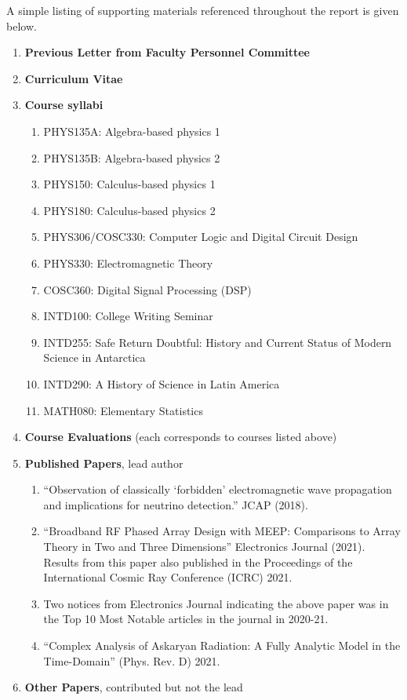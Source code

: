 \documentclass[../../main.tex]{subfiles}
\begin{document}
A simple listing of supporting materials referenced throughout the report is given below.
\begin{enumerate}
\item \textbf{Previous Letter from Faculty Personnel Committee}
\item \textbf{Curriculum Vitae}
\item \textbf{Course syllabi}
\begin{enumerate}
\item PHYS135A: Algebra-based physics 1
\item PHYS135B: Algebra-based physics 2
\item PHYS150: Calculus-based physics 1
\item PHYS180: Calculus-based physics 2
\item PHYS306/COSC330: Computer Logic and Digital Circuit Design
\item PHYS330: Electromagnetic Theory
\item COSC360: Digital Signal Processing (DSP)
\item INTD100: College Writing Seminar
\item INTD255: Safe Return Doubtful: History and Current Status of Modern Science in Antarctica
\item INTD290: A History of Science in Latin America
\item MATH080: Elementary Statistics
\end{enumerate}
\item \textbf{Course Evaluations} (each corresponds to courses listed above)
\item \textbf{Published Papers}, lead author
\begin{enumerate}
\item ``Observation of classically `forbidden' electromagnetic wave propagation and implications for neutrino detection.'' JCAP (2018).
\item ``Broadband RF Phased Array Design with MEEP: Comparisons to Array Theory in Two and Three Dimensions'' Electronics Journal (2021).  Results from this paper also published in the Proceedings of the International Cosmic Ray Conference (ICRC) 2021.
\item Two notices from Electronics Journal indicating the above paper was in the Top 10 Most Notable articles in the journal in 2020-21.
\item ``Complex Analysis of Askaryan Radiation: A Fully Analytic Model in the Time-Domain'' (Phys. Rev. D) 2021.
\end{enumerate}
\item \textbf{Other Papers}, contributed but not the lead

\end{enumerate}
\end{document}
